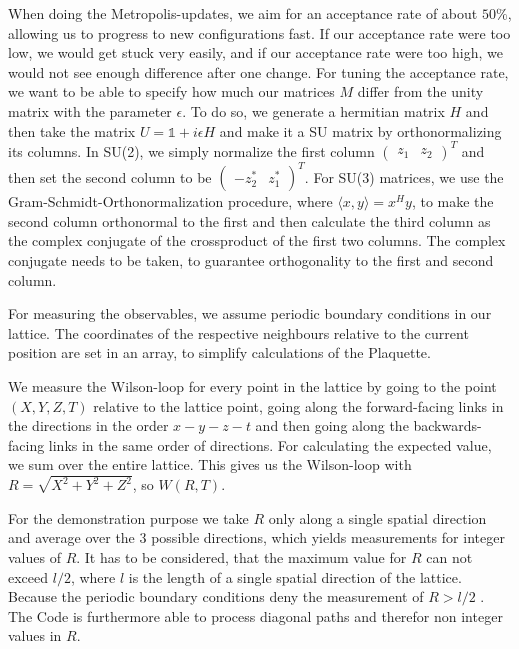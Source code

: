 \documentclass[%
 reprint,
 amsmath,amssymb,
 aps,
]{revtex4-1}
\begin{document}
When doing the Metropolis-updates, we aim for an acceptance rate of about $50\%$, allowing us to progress to new configurations fast. If our acceptance rate were too low, we would get stuck very easily, and if our acceptance rate were too high, we would not see enough difference after one change.
For tuning the acceptance rate, we want to be able to specify how much our matrices $M$ differ from the unity matrix with the parameter $\epsilon$. To do so, we generate a hermitian matrix $H$   and then take the matrix $U=\mathbb{1}+i\epsilon H$ and make it a SU matrix by orthonormalizing its columns. In SU(2), we simply normalize the first column $\begin{pmatrix}z_1&z_2\end{pmatrix}^T$ and then set the second column to be $\begin{pmatrix}-z_2^*&z_1^*\end{pmatrix}^T$. For SU(3) matrices, we use the Gram-Schmidt-Orthonormalization procedure, where $\langle x,y\rangle=x^Hy$, to make the second column orthonormal to the first and then calculate the third column as the complex conjugate of the crossproduct of the first two columns. The complex conjugate needs to be taken, to guarantee orthogonality to the first and second column.

For measuring the observables, we assume periodic boundary conditions in our lattice. The coordinates of the respective neighbours relative to the current position are set in an array, to simplify calculations of the Plaquette.

We measure the Wilson-loop for every point in the lattice by going to the point $(X,Y,Z,T)$ relative to the lattice point, going along the forward-facing links in the directions in the order $x-y-z-t$ and then going along the backwards-facing links in the same order of directions. For calculating the expected value, we sum over the entire lattice. This gives us the Wilson-loop with $R=\sqrt{X^2+Y^2+Z^2}$, so $W(R, T)$. 

For the demonstration purpose we take $R$ only along a single spatial direction and average over the $3$ possible directions, which yields measurements for integer values of $R$. It has to be considered, that the maximum value for $R$ can not exceed $l/2$, where $l$ is the length of a single spatial direction of the lattice. Because the periodic boundary conditions deny the measurement of $R>l/2$ .
The Code is furthermore able to process diagonal paths and therefor non integer values in $R$. 
\end{document}
